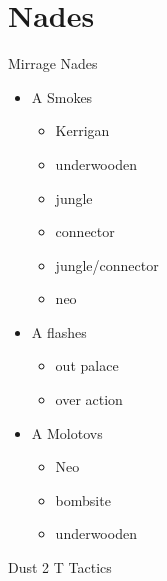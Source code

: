 \section{Nades}
\label{sect:Mirrage_nades}
Mirrage Nades
\begin{itemize}
\item A Smokes
	\begin{itemize}
	\item Kerrigan
	\item underwooden
	\item jungle
	\item connector
	\item jungle/connector
	\item neo
	\end{itemize}
\item A flashes
	\begin{itemize}
	\item out palace
	\item over action
	\end{itemize}
\item A Molotovs
	\begin{itemize}
	\item Neo
	\item bombsite
	\item underwooden
	\end{itemize}
\end{itemize}
\label{sect:mirrage_t}
Dust 2 T Tactics

